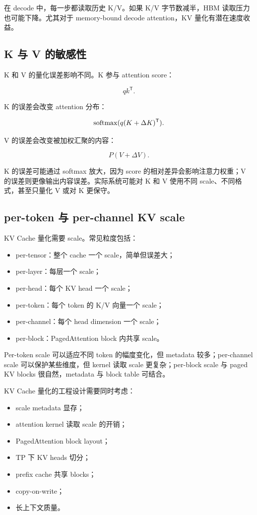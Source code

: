 在 decode 中，每一步都读取历史 K/V。如果 K/V 字节数减半，HBM 读取压力也可能下降。尤其对于 memory-bound decode attention，KV 量化有潜在速度收益。

\subsection{K 与 V 的敏感性}
\label{subsec:k-v-sensitivity}

K 和 V 的量化误差影响不同。K 参与 attention score：

\[
qk^{\mathsf{T}}.
\]

K 的误差会改变 attention 分布：

\[
\operatorname{softmax}(q(K+\Delta K)^{\mathsf{T}}).
\]

V 的误差会改变被加权汇聚的内容：

\[
P(V+\Delta V).
\]

K 的误差可能通过 softmax 放大，因为 score 的相对差异会影响注意力权重；V 的误差则更像输出内容误差。实际系统可能对 K 和 V 使用不同 scale、不同格式，甚至只量化 V 或对 K 更保守。

\subsection{per-token 与 per-channel KV scale}
\label{subsec:kv-per-token-per-channel-scale}

KV Cache 量化需要 scale。常见粒度包括：

\begin{itemize}
\item per-tensor：整个 cache 一个 scale，简单但误差大；
\item per-layer：每层一个 scale；
\item per-head：每个 KV head 一个 scale；
\item per-token：每个 token 的 K/V 向量一个 scale；
\item per-channel：每个 head dimension 一个 scale；
\item per-block：PagedAttention block 内共享 scale。
\end{itemize}

Per-token scale 可以适应不同 token 的幅度变化，但 metadata 较多；per-channel scale 可以保护某些维度，但 kernel 读取 scale 更复杂；per-block scale 与 paged KV blocks 很自然，metadata 与 block table 可结合。

KV Cache 量化的工程设计需要同时考虑：

\begin{itemize}
\item scale metadata 显存；
\item attention kernel 读取 scale 的开销；
\item PagedAttention block layout；
\item TP 下 KV heads 切分；
\item prefix cache 共享 blocks；
\item copy-on-write；
\item 长上下文质量。
\end{itemize}

